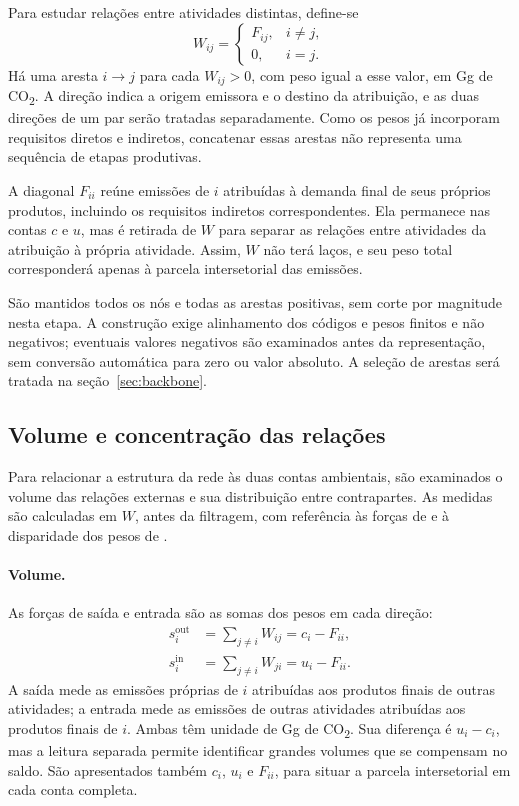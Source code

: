 Para estudar relações entre atividades distintas, define-se
\begin{equation}
W_{ij}=\begin{cases}
F_{ij}, & i\ne j,\\
0, & i=j.
\end{cases}
\label{eq:rede-sem-diagonal}
\end{equation}
Há uma aresta $i\rightarrow j$ para cada $W_{ij}>0$, com peso igual a esse valor, em Gg de CO\textsubscript{2}. A direção indica a origem emissora e o destino da atribuição, e as duas direções de um par serão tratadas separadamente. Como os pesos já incorporam requisitos diretos e indiretos, concatenar essas arestas não representa uma sequência de etapas produtivas.

A diagonal $F_{ii}$ reúne emissões de $i$ atribuídas à demanda final de seus próprios produtos, incluindo os requisitos indiretos correspondentes. Ela permanece nas contas $c$ e $u$, mas é retirada de $W$ para separar as relações entre atividades da atribuição à própria atividade. Assim, $W$ não terá laços, e seu peso total corresponderá apenas à parcela intersetorial das emissões.

São mantidos todos os nós e todas as arestas positivas, sem corte por magnitude nesta etapa. A construção exige alinhamento dos códigos e pesos finitos e não negativos; eventuais valores negativos são examinados antes da representação, sem conversão automática para zero ou valor absoluto. A seleção de arestas será tratada na seção~\ref{sec:backbone}.

\subsection{Volume e concentração das relações}
\label{sec:volume-concentracao}

Para relacionar a estrutura da rede às duas contas ambientais, são examinados o volume das relações externas e sua distribuição entre contrapartes. As medidas são calculadas em $W$, antes da filtragem, com referência às forças de \textcite{huang2019} e à disparidade dos pesos de \textcite{serrano2009}.

\paragraph{Volume.}
As forças de saída e entrada são as somas dos pesos em cada direção:
\begin{equation}
\begin{aligned}
s_i^{\mathrm{out}}&=\sum_{j\ne i}W_{ij}=c_i-F_{ii},\\
s_i^{\mathrm{in}}&=\sum_{j\ne i}W_{ji}=u_i-F_{ii}.
\end{aligned}
\label{eq:forcas-externas}
\end{equation}
A saída mede as emissões próprias de $i$ atribuídas aos produtos finais de outras atividades; a entrada mede as emissões de outras atividades atribuídas aos produtos finais de $i$. Ambas têm unidade de Gg de CO\textsubscript{2}. Sua diferença é $u_i-c_i$, mas a leitura separada permite identificar grandes volumes que se compensam no saldo. São apresentados também $c_i$, $u_i$ e $F_{ii}$, para situar a parcela intersetorial em cada conta completa.

